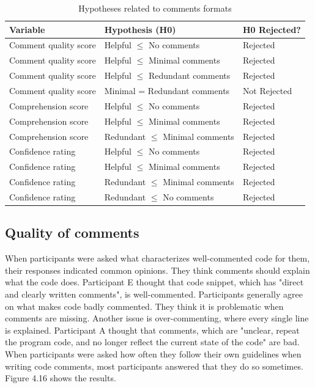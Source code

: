 \begin{table}[ht]
\centering
\small
\begin{tabular}{|p{4cm}|p{6cm}|p{2.5cm}|}
\hline
\rule{0pt}{1.2em}\textbf{Variable} & \textbf{Hypothesis (H0)} & \textbf{H0 Rejected?} \\[0.5em]
\hline
\rule{0pt}{1.2em}Comment quality score & Helpful $\leq$ No comments & Rejected \\[0.5em]
\hline
\rule{0pt}{1.2em}Comment quality score & Helpful $\leq$ Minimal comments & Rejected \\[0.5em]
\hline
\rule{0pt}{1.2em}Comment quality score & Helpful $\leq$ Redundant comments & Rejected \\[0.5em]
\hline
\rule{0pt}{1.2em}Comment quality score & Minimal = Redundant comments & Not Rejected \\[0.5em]
\hline
\rule{0pt}{1.2em}Comprehension score & Helpful $\leq$ No comments & Rejected \\[0.5em]
\hline
\rule{0pt}{1.2em}Comprehension score & Helpful $\leq$ Minimal comments & Rejected \\[0.5em]
\hline
\rule{0pt}{1.2em}Comprehension score & Redundant $\leq$ Minimal comments & Rejected \\[0.5em]
\hline
\rule{0pt}{1.2em}Confidence rating & Helpful $\leq$ No comments & Rejected \\[0.5em]
\hline
\rule{0pt}{1.2em}Confidence rating & Helpful $\leq$ Minimal comments & Rejected \\[0.5em]
\hline
\rule{0pt}{1.2em}Confidence rating & Redundant $\leq$ Minimal comments & Rejected \\[0.5em]
\hline
\rule{0pt}{1.2em}Confidence rating & Redundant $\leq$ No comments & Rejected \\[0.5em]
\hline
\end{tabular}
\caption{Hypotheses related to comments formats}
\end{table}



\subsection{Quality of comments}


When participants were asked what characterizes well-commented code for them, their responses indicated common opinions. They think comments should explain what the code does. Participant E thought that code snippet, which has "direct and clearly written comments", is well-commented. Participants generally agree on what makes code badly commented. They think it is problematic when comments are missing. Another issue is over-commenting, where every single line is explained. Participant A thought that comments, which are "unclear, repeat the program code, and no longer reflect the current state of the code" are bad. When participants were asked how often they follow their own guidelines when writing code comments, most participants answered that they do so sometimes. Figure 4.16 shows the results.

